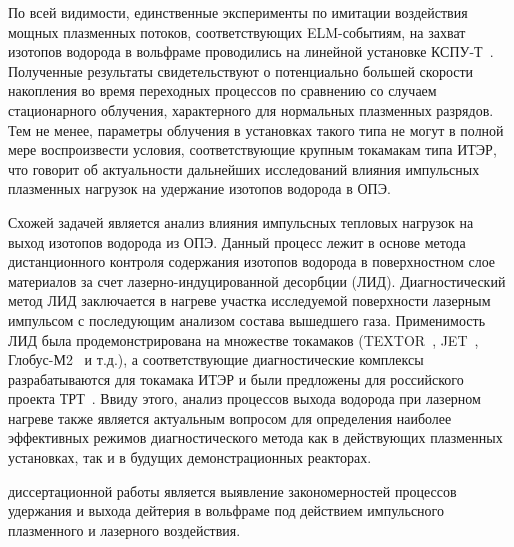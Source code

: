 По всей видимости, единственные эксперименты по имитации воздействия мощных плазменных потоков, соответствующих ELM-событиям, на захват изотопов водорода в вольфраме проводились на линейной установке КСПУ-Т~\cite{Ogorodnikova}. Полученные результаты свидетельствуют о потенциально большей скорости накопления во время переходных процессов по сравнению со случаем стационарного облучения, характерного для нормальных плазменных разрядов. Тем не менее, параметры облучения в установках такого типа не могут в полной мере воспроизвести условия, соответствующие крупным токамакам типа ИТЭР, что говорит об актуальности дальнейших исследований влияния импульсных плазменных нагрузок на удержание изотопов водорода в ОПЭ.

Схожей задачей является анализ влияния импульсных тепловых нагрузок на выход изотопов водорода из ОПЭ. Данный процесс лежит в основе метода дистанционного контроля содержания изотопов водорода в поверхностном слое материалов за счет лазерно-индуцированной десорбции (ЛИД). Диагностический метод ЛИД заключается в нагреве участка исследуемой поверхности лазерным импульсом с последующим анализом состава вышедшего газа. Применимость ЛИД была продемонстрирована на множестве токамаков (TEXTOR~\cite{Schweer2009}, JET~\cite{Zlobinski2024}, Глобус-М2~\cite{Medvedev2024} и т.д.), а соответствующие диагностические комплексы разрабатываются для токамака ИТЭР и были предложены для российского проекта ТРТ~\cite{Razdobarin2022}. Ввиду этого, анализ процессов выхода водорода при лазерном нагреве также является актуальным вопросом для определения наиболее эффективных режимов диагностического метода как в действующих плазменных установках, так и в будущих демонстрационных реакторах.

{\aim} диссертационной работы является выявление закономерностей процессов удержания и выхода дейтерия в вольфраме под действием импульсного плазменного и
лазерного воздействия.

